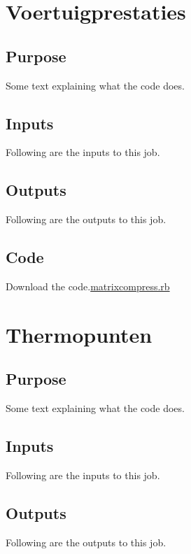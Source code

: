 \documentclass[
  letterpaper,
  DIV=11,
  numbers=noendperiod]{scrreprt}
\begin{document}
\chapter{Voertuigprestaties}\label{voertuigprestaties}

\section{Purpose}

Some text explaining what the code does.

\section{Inputs}

Following are the inputs to this job.

\section{Outputs}

Following are the outputs to this job.

\section{Code}

Download the code.\href{../first.rb}{matrixcompress.rb}

\chapter{Thermopunten}\label{thermopunten}

\section{Purpose}

Some text explaining what the code does.

\section{Inputs}

Following are the inputs to this job.

\section{Outputs}

Following are the outputs to this job.
\end{document}
